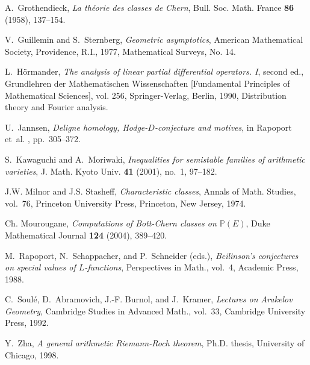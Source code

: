 \documentclass[10pt,twoside]{article}
\numberwithin{equation}{section}
\theoremstyle{plain}
\theoremstyle{definition}
\begin{document}
\begin{thebibliography}{10}
A.~Grothendieck, \emph{La th{\'e}orie des classes de {C}hern}, Bull. Soc. Math.
  France \textbf{86} (1958), 137--154.

V.~Guillemin and S.~Sternberg, \emph{Geometric asymptotics}, American
  Mathematical Society, Providence, R.I., 1977, Mathematical Surveys, No. 14.

L.~H{\"o}rmander, \emph{The analysis of linear partial differential operators.
  {I}}, second ed., Grundlehren der Mathematischen Wissenschaften [Fundamental
  Principles of Mathematical Sciences], vol. 256, Springer-Verlag, Berlin,
  1990, Distribution theory and Fourier analysis. 

U.~Jannsen, \emph{Deligne homology, {H}odge-{$D$}-conjecture and motives}, in
  Rapoport et~al. \cite{Rapoport:csvlf}, pp.~305--372.

S.~Kawaguchi and A.~Moriwaki, \emph{Inequalities for semistable families of
  arithmetic varieties}, J. Math. Kyoto Univ. \textbf{41} (2001), no.~1,
  97--182. 

J.W. Milnor and J.S. Stasheff, \emph{Characteristic classes}, Annals of Math.
  Studies, vol.~76, Princeton University Press, Princeton, New Jersey, 1974.

Ch. Mourougane, \emph{Computations of {B}ott-{C}hern classes on
  {$\mathbb{P}(E)$}}, Duke Mathematical Journal \textbf{124} (2004), 389--420.

M.~Rapoport, N.~Schappacher, and P.~Schneider (eds.), \emph{Beilinson's
  conjectures on special values of ${L}$-functions}, Perspectives in Math.,
  vol.~4, Academic Press, 1988.

C.~Soul\'e, D.~Abramovich, J.-F. Burnol, and J.~Kramer, \emph{Lectures on
  {A}rakelov {G}eometry}, Cambridge Studies in Advanced Math., vol.~33,
  Cambridge University Press, 1992.

Y.~Zha, \emph{A general arithmetic {R}iemann-{R}och theorem}, Ph.D. thesis,
  University of Chicago, 1998.

\end{thebibliography}

\Addresses
\end{document}

